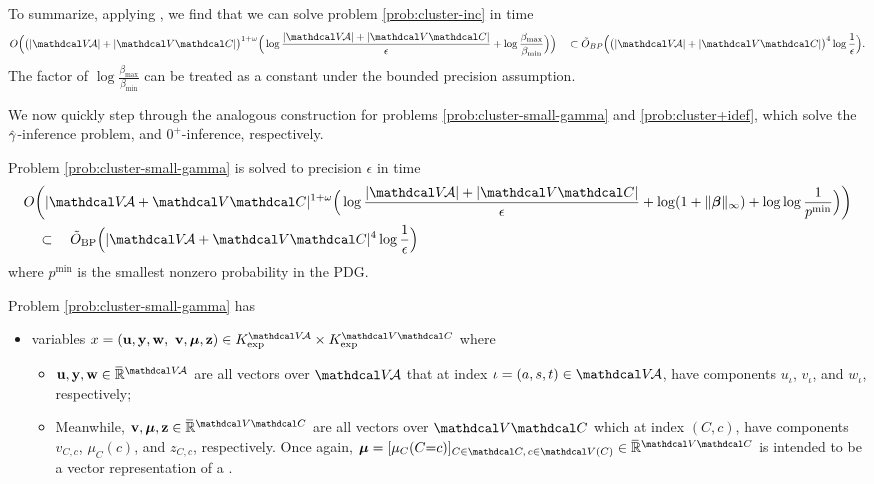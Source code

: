 \begin{subappendices}
\begin{lproof}
    To summarize, applying , we find that we can solve problem \eqref{prob:cluster-inc} in time
    \begin{align*}
        O\Big( \big(|\V\!\Ar| + |\V\C|\big)^{1 + \omega} \Big( \log \frac{ |\V\!\Ar| + |\V\C| }{\epsilon} + \log \frac{\beta_{\max}}{\beta_{\min}} \Big) \Big)
        \quad
        \subset \tilde O_{BP}\Big( \big(|\V\!\Ar| + |\V\C| \big)^4 \log \frac1\epsilon\Big).
    \end{align*}
    The factor of $\log\frac{\beta_{\max}}{\beta_{\min}}$ can be treated as a constant under the bounded precision assumption.
\end{lproof}

We now quickly step through the analogous construction for problems \eqref{prob:cluster-small-gamma} and \eqref{prob:cluster+idef}, which
solve the $\zogamma$-inference problem, and $0^+$-inference, respectively.

\begin{lemma}\label{lem:smallgamma-polytime}
    Problem \eqref{prob:cluster-small-gamma} is solved to precision $\epsilon$ in time
    \begin{align*}
        &O\bigg( |\V\!\Ar + \V\C|^{1 + \omega} \Big( \log \frac{ |\V\!\Ar| + |\V\C|}{\epsilon} + \log(1+ \Vert\bbeta\Vert_\infty) + \log \log \frac{1}{p^{\min}} \Big) \bigg)
        \\&\quad
        \subset
        \quad
        \tilde O_{\text{BP}}\Big( |\V\!\Ar + \V\C|^4 \log\frac1\epsilon \Big)
    \end{align*}
    where $p^{\min}$ is the smallest nonzero probability in the PDG.
\end{lemma}
\begin{lproof}
    Problem \eqref{prob:cluster-small-gamma} has
    \begin{itemize}[label=$\blacktriangleright$]
    \item variables
        $x = (\mat u, \mat y, \mat w,\,\, \mat v, \bmu, \mat z)
        \in K_{\exp}^{\V\!\Ar} \times K_{\exp}^{\V \C}$
        where
        \begin{itemize}[label=\textbullet]
        \item
        $\mathbf{u,y,w} \in \Rext^{\V\!\Ar}$
            are all vectors over $\V\!\Ar$
            that at index $\iota = (a,s,t) \in \V\!\Ar$, have
            components $u_\iota$, $v_\iota$, and $w_\iota$, respectively;
        \item
        Meanwhile,
        $\mathbf{v,\bmu,z} \in \Rext^{\V\C}$
            are all vectors over $\V\C$
            which at index $(C,c)$, have
            components $v_{C,c}$, $\mu_C(c)$, and $z_{C,c}$, respectively.
            Once again, $\bmu = [\mu_{C}(C{=}c)]_%
            {C \in \C,\,c \in\V(C)}
             \in \Rext^{\V \C}$ is intended to be a vector representation of a \actree.
    \end{itemize}


\end{itemize}
\end{lproof}
\end{subappendices}
